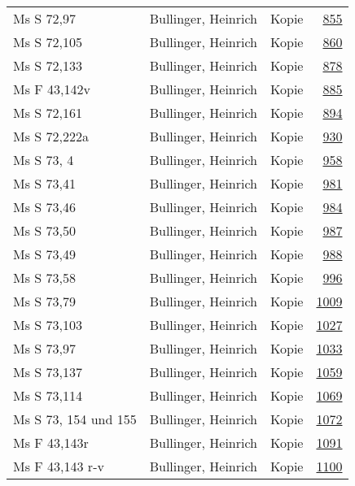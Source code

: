 \documentclass[10pt,a4paper,landscape]{report}
\begin{document}
\begin{longtable}{p{16cm}p{4cm}lr}
Ms S 72,97	&	Bullinger, Heinrich	&	Kopie	&	\href{http://130.60.24.72/assignment/855}{855}\\
Ms S 72,105	&	Bullinger, Heinrich	&	Kopie	&	\href{http://130.60.24.72/assignment/860}{860}\\
Ms S 72,133	&	Bullinger, Heinrich	&	Kopie	&	\href{http://130.60.24.72/assignment/878}{878}\\
Ms F 43,142v	&	Bullinger, Heinrich	&	Kopie	&	\href{http://130.60.24.72/assignment/885}{885}\\
Ms S 72,161	&	Bullinger, Heinrich	&	Kopie	&	\href{http://130.60.24.72/assignment/894}{894}\\
Ms S 72,222a	&	Bullinger, Heinrich	&	Kopie	&	\href{http://130.60.24.72/assignment/930}{930}\\
Ms S 73, 4	&	Bullinger, Heinrich	&	Kopie	&	\href{http://130.60.24.72/assignment/958}{958}\\
Ms S 73,41	&	Bullinger, Heinrich	&	Kopie	&	\href{http://130.60.24.72/assignment/981}{981}\\
Ms S 73,46	&	Bullinger, Heinrich	&	Kopie	&	\href{http://130.60.24.72/assignment/984}{984}\\
Ms S 73,50	&	Bullinger, Heinrich	&	Kopie	&	\href{http://130.60.24.72/assignment/987}{987}\\
Ms S 73,49	&	Bullinger, Heinrich	&	Kopie	&	\href{http://130.60.24.72/assignment/988}{988}\\
Ms S 73,58	&	Bullinger, Heinrich	&	Kopie	&	\href{http://130.60.24.72/assignment/996}{996}\\
Ms S 73,79	&	Bullinger, Heinrich	&	Kopie	&	\href{http://130.60.24.72/assignment/1009}{1009}\\
Ms S 73,103	&	Bullinger, Heinrich	&	Kopie	&	\href{http://130.60.24.72/assignment/1027}{1027}\\
Ms S 73,97	&	Bullinger, Heinrich	&	Kopie	&	\href{http://130.60.24.72/assignment/1033}{1033}\\
Ms S 73,137	&	Bullinger, Heinrich	&	Kopie	&	\href{http://130.60.24.72/assignment/1059}{1059}\\
Ms S 73,114	&	Bullinger, Heinrich	&	Kopie	&	\href{http://130.60.24.72/assignment/1069}{1069}\\
Ms S 73, 154 und 155	&	Bullinger, Heinrich	&	Kopie	&	\href{http://130.60.24.72/assignment/1072}{1072}\\
Ms F 43,143r	&	Bullinger, Heinrich	&	Kopie	&	\href{http://130.60.24.72/assignment/1091}{1091}\\
Ms F 43,143 r-v	&	Bullinger, Heinrich	&	Kopie	&	\href{http://130.60.24.72/assignment/1100}{1100}\\

\end{longtable}
\end{document}
